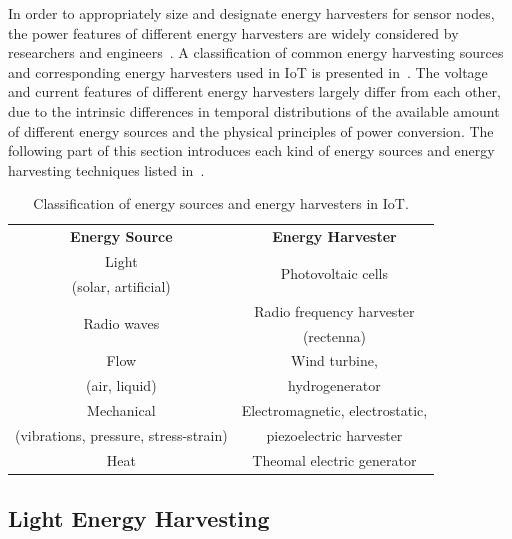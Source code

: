 In order to appropriately size and designate energy harvesters for sensor nodes, the power features of different energy harvesters are widely considered by researchers and engineers~\cite{moss2015scaling}. A classification of common energy harvesting sources and corresponding energy harvesters used in IoT is presented in~. The voltage and current features of different energy harvesters largely differ from each other, due to the intrinsic differences in temporal distributions of the available amount of different energy sources and the physical principles of power conversion. The following part of this section introduces each kind of energy sources and energy harvesting techniques listed in~.

\begin{table}
    \renewcommand{\arraystretch}{1.2}
    \centering
    \begin{tabular}{|c|c|}
    \hline
    \multirow{2}{*}{\textbf{Energy Source}} & \multirow{2}{*}{\textbf{Energy Harvester}} \\
    & \\ 
    \hline
    Light & \multirow{2}{*}{Photovoltaic cells} \\
    (solar, artificial) & \\ 
    \hline
    \multirow{2}{*}{Radio waves} & Radio frequency harvester \\ 
    & (rectenna) \\ 
    \hline
    Flow & Wind turbine, \\ 
    (air, liquid) & hydrogenerator \\ 
    \hline
    Mechanical & Electromagnetic, electrostatic, \\ 
    (vibrations, pressure, stress-strain) & piezoelectric harvester \\ 
    \hline
    \multirow{2}{*}{Heat} & \multirow{2}{*}{Theomal electric generator} \\
    & \\  
    \hline
    \end{tabular}
    \caption{Classification of energy sources and energy harvesters in IoT.}
    \label{Table:energysources}
\end{table}

\subsection{Light Energy Harvesting}

